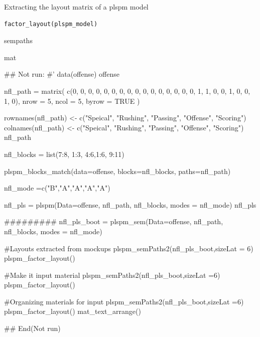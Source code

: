 \documentclass[a4paper]{book}
\begin{document}
%
\begin{Description}
Extracting the layout matrix of a plspm model
\end{Description}
%
\begin{Usage}
\begin{verbatim}
factor_layout(plspm_model)
\end{verbatim}
\end{Usage}
%
\begin{Arguments}
\begin{ldescription}
\item[\code{plspm\_model}] sempaths
\end{ldescription}
\end{Arguments}
%
\begin{Value}
mat
\end{Value}
%
\begin{Examples}
\begin{ExampleCode}

\#\# Not run: 
#'
data(offense)
offense %

nfl_path = matrix(
  c(0, 0, 0, 0, 0,
    0, 0, 0, 0, 0,
    0, 0, 0, 0, 0,
    0, 1, 1, 0, 0,
    1, 0, 0, 1, 0),
  nrow = 5, ncol = 5, byrow = TRUE )

rownames(nfl_path) <- c("Speical", "Rushing", "Passing", "Offense", "Scoring")
colnames(nfl_path) <- c("Speical", "Rushing", "Passing", "Offense", "Scoring")
nfl_path

nfl_blocks = list(7:8, 1:3, 4:6,1:6, 9:11)

plspm_blocks_match(data=offense, blocks=nfl_blocks,
                   paths=nfl_path)

nfl_mode =c("B","A","A","A","A")

nfl_pls = plspm(Data=offense, nfl_path, nfl_blocks, modes = nfl_mode)
nfl_pls%

#########
nfl_pls_boot = plspm_sem(Data=offense, nfl_path, nfl_blocks, modes = nfl_mode)

#Layouts extracted from mockups
plspm_semPaths2(nfl_pls_boot,sizeLat = 6)%
  plspm_factor_layout()

#Make it input material
plspm_semPaths2(nfl_pls_boot,sizeLat =6)%
  plspm_factor_layout() %

#Organizing materials for input
plspm_semPaths2(nfl_pls_boot,sizeLat =6)%
  plspm_factor_layout() %
  mat_text_arrange()

## End(Not run)



\end{ExampleCode}
\end{Examples}
\end{document}

